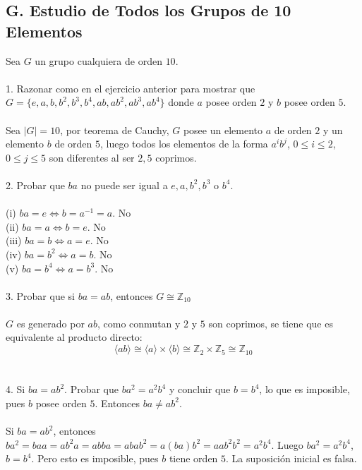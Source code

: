 \documentclass{article}
\newcommand{\Z}{\mathbb{Z}}
\begin{document}
\subsection*{G. Estudio de Todos los Grupos de 10 Elementos}
Sea $G$ un grupo cualquiera de orden $10$.
\\
\\
1. Razonar como en el ejercicio anterior para mostrar que $G=\{e,a,b,b^{2},b^{3},b^{4},ab,ab^{2},ab^{3},ab^{4} \}$ donde $a$ posee orden $2$ y $b$ posee orden $5$.
\\
\\
Sea $|G|=10$, por teorema de Cauchy, $G$ posee un elemento $a$ de orden $2$ y un elemento $b$ de orden $5$, luego todos los elementos de la forma $a^{i}b^{j}$, $0 \leq i \leq 2$, $0 \leq j \leq 5$ son diferentes al ser $2,5$ coprimos.
\\
\\
2. Probar que $ba$ no puede ser igual a $e,a,b^{2},b^{3}$ o $b^4$.
\\
\\
(i) $ba=e \Longleftrightarrow b=a^{-1}=a$. No
\\
(ii) $ba=a \Longleftrightarrow b=e$. No
\\
(iii) $ba=b \Longleftrightarrow a=e$. No
\\
(iv) $ba=b^{2} \Longleftrightarrow a=b$. No
\\
(v) $ba=b^4 \Longleftrightarrow a=b^{3}$. No
\\
\\
3. Probar que si $ba=ab$, entonces $G \cong \Z_{10}$
\\
\\
$G$ es generado por $ab$, como conmutan y $2$ y $5$ son coprimos, se tiene que es equivalente al producto directo:
\begin{equation*}
    \langle ab \rangle \cong \langle a \rangle \times \langle b \rangle \cong \Z_2 \times \Z_5 \cong \Z_{10}
\end{equation*}
\\
\\
4. Si $ba=ab^{2}$. Probar que $ba^{2}=a^{2}b^{4}$ y concluir que $b=b^4$, lo que es imposible, pues $b$ posee orden $5$. Entonces $ba \neq ab^{2}$.
\\
\\
Si $ba=ab^{2}$, entonces $ba^{2}=baa=ab^{2}a=abba=abab^{2}=a(ba)b^{2}=aab^{2}b^{2}=a^{2}b^{4}$. Luego $ba^{2}=a^{2}b^{4}$, $b=b^{4}$. Pero esto es imposible, pues $b$ tiene orden $5$. La suposición inicial es falsa.
\\
\end{document}
